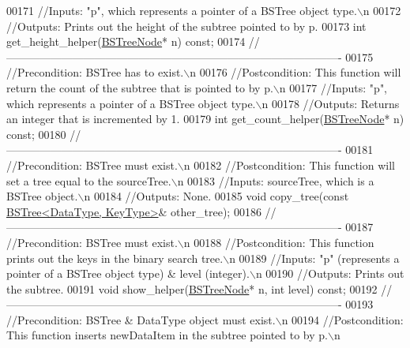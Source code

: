 \begin{DoxyCode}
00171     \textcolor{comment}{//Inputs: "p", which represents a pointer of a BSTree object type.\(\backslash\)n}
00172     \textcolor{comment}{//Outputs: Prints out the height of the subtree pointed to by p.}
00173     \textcolor{keywordtype}{int}  get\_height\_helper(\hyperlink{class_b_s_tree_1_1_b_s_tree_node}{BSTreeNode}* n) \textcolor{keyword}{const};
00174     \textcolor{comment}{//-------------------------------------------------------------------------------------------}
00175     \textcolor{comment}{//Precondition: BSTree has to exist.\(\backslash\)n}
00176     \textcolor{comment}{//Postcondition: This function will return the count of the subtree that is pointed to by p.\(\backslash\)n}
00177     \textcolor{comment}{//Inputs: "p", which represents a pointer of a BSTree object type.\(\backslash\)n}
00178     \textcolor{comment}{//Outputs: Returns an integer that is incremented by 1. }
00179     \textcolor{keywordtype}{int}  get\_count\_helper(\hyperlink{class_b_s_tree_1_1_b_s_tree_node}{BSTreeNode}* n) \textcolor{keyword}{const};
00180     \textcolor{comment}{//-------------------------------------------------------------------------------------------}
00181     \textcolor{comment}{//Precondition: BSTree must exist.\(\backslash\)n}
00182     \textcolor{comment}{//Postcondition: This function will set a tree equal to the sourceTree.\(\backslash\)n}
00183     \textcolor{comment}{//Inputs: sourceTree, which is a BSTree object.\(\backslash\)n}
00184     \textcolor{comment}{//Outputs: None.}
00185     \textcolor{keywordtype}{void} copy\_tree(\textcolor{keyword}{const} \hyperlink{class_b_s_tree}{BSTree<DataType, KeyType>}& other\_tree);
00186     \textcolor{comment}{//-------------------------------------------------------------------------------------------}
00187     \textcolor{comment}{//Precondition: BSTree must exist.\(\backslash\)n}
00188     \textcolor{comment}{//Postcondition: This function prints out the keys in the binary search tree.\(\backslash\)n}
00189     \textcolor{comment}{//Inputs: "p" (represents a pointer of a BSTree object type) & level (integer).\(\backslash\)n}
00190     \textcolor{comment}{//Outputs: Prints out the subtree.}
00191     \textcolor{keywordtype}{void} show\_helper(\hyperlink{class_b_s_tree_1_1_b_s_tree_node}{BSTreeNode}* n, \textcolor{keywordtype}{int} level) \textcolor{keyword}{const};
00192     \textcolor{comment}{//-------------------------------------------------------------------------------------------}
00193     \textcolor{comment}{//Precondition: BSTree & DataType object must exist.\(\backslash\)n}
00194     \textcolor{comment}{//Postcondition: This function inserts newDataItem in the subtree pointed to by p.\(\backslash\)n}

\end{DoxyCode}
